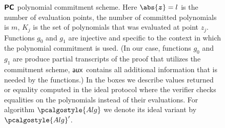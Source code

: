 \begin{figure}
{\begin{minipage}{15,5cm}
\begin{pcvstack}[]
\begin{pchstack}
    \end{pchstack}
	\end{pcvstack}
\end{minipage}
  }
	\caption{$\bm{\mathsf{PC}}$ polynomial commitment scheme. Here $\abs{\vec{z}} = l$ is the number of evaluation points, the number of committed polynomials is $m$, $K_j$ is the set of polynomials that was evaluated at point $z_j$. Functions $g_0$ and $g_1$ are injective and specific to the context in which the polynomial commitment is used. (In our case, functions $g_0$ and $g_1$ are produce partial transcripts of the proof that utilizes the commitment scheme, $\mathsf{aux}$ contains all additional information that is needed by the functions.)
  In the boxes we describe values returned or equality computed in the ideal protocol where the verifier checks equalities on the polynomials instead of their evaluations. For algorithm $\pcalgostyle{Alg}$ we denote its ideal variant by $\pcalgostyle{Alg}'$.}
	\label{fig:pcomp}
  \end{figure}

